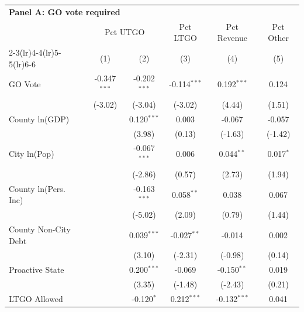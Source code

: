 \begingroup
\centering
\begin{tabular*}{\textwidth}{@{\extracolsep{\fill}}lccccc}
\multicolumn{5}{l}{\textbf{Panel A: GO vote required}}\\

\addlinespace
   \toprule
    & \multicolumn{2}{c}{Pct UTGO} & Pct LTGO & Pct Revenue & Pct Other\\
   \cmidrule(lr){2-3}\cmidrule(lr){4-4}\cmidrule(lr){5-5}\cmidrule(lr){6-6}
                               & (1)            & (2)            & (3)            & (4)            & (5)\\  
   \midrule 
   GO Vote                     & -0.347$^{***}$ & -0.202$^{***}$ & -0.114$^{***}$ & 0.192$^{***}$  & 0.124\\   
                               & (-3.02)       & (-3.04)       & (-3.02)       & (4.44)        & (1.51)\\   
   County ln(GDP)              &                & 0.120$^{***}$  & 0.003          & -0.067         & -0.057\\   
                               &                & (3.98)        & (0.13)        & (-1.63)       & (-1.42)\\   
   City ln(Pop)                &                & -0.067$^{***}$ & 0.006          & 0.044$^{**}$   & 0.017$^{*}$\\   
                               &                & (-2.86)       & (0.57)        & (2.73)        & (1.94)\\   
   County ln(Pers. Inc)        &                & -0.163$^{***}$ & 0.058$^{**}$   & 0.038          & 0.067\\   
                               &                & (-5.02)       & (2.09)        & (0.79)        & (1.44)\\   
   County Non-City Debt        &                & 0.039$^{***}$  & -0.027$^{**}$  & -0.014         & 0.002\\   
                               &                & (3.10)        & (-2.31)       & (-0.98)       & (0.14)\\   
   Proactive State             &                & 0.200$^{***}$  & -0.069         & -0.150$^{**}$  & 0.019\\   
                               &                & (3.35)        & (-1.48)       & (-2.43)       & (0.21)\\   
   LTGO Allowed                &                & -0.120$^{*}$   & 0.212$^{***}$  & -0.132$^{***}$ & 0.041\\   

\end{tabular*}
